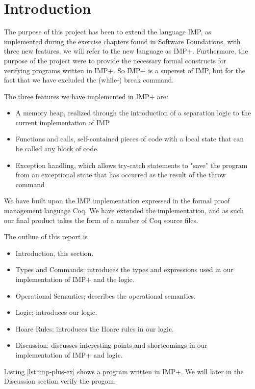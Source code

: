 
\section{Introduction}
The purpose of this project has been to extend the language IMP, as implemented during the exercise chapters found in Software Foundations, with three new features, we will refer to the new language as IMP+. Furthermore, the purpose of the project were to provide the necessary formal constructs for verifying programs written in IMP+. So IMP+ is a superset of IMP, but for the fact that we have excluded the (while-) break command.

The three features we have implemented in IMP+ are:
\begin{itemize}
\item A memory heap, realized through the introduction of a separation logic to the current implementation of IMP
\item Functions and calls, self-contained pieces of code with a local state that can be called any block of code.
\item Exception handling, which allows try-catch statements to "save" the program from an exceptional state that has occurred as the result of the throw command
\end{itemize}

We have built upon the IMP implementation expressed in the formal proof management language Coq. We have extended the implementation, and as such our final product takes the form of a number of Coq source files.

The outline of this report is
\begin{itemize}
\item Introduction, this section.
\item Types and Commands; introduces the types and expressions used in our implementation of IMP+ and the logic.
\item Operational Semantics; describes the operational semantics.
\item Logic; introduces our logic.
\item Hoare Rules; introduces the Hoare rules in our logic.
\item Discussion; discusses interesting points and shortcomings in our implementation of IMP+ and logic.
\end{itemize}

Listing \ref{lst:imp-plus-ex} shows a program written in IMP+. We will later in the Discussion section verify the progom.

